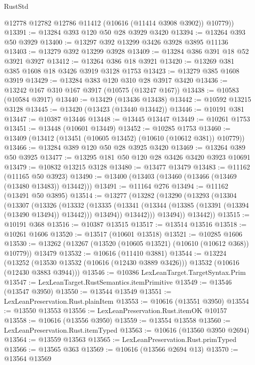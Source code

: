 \begin{lexlean}{RustStd}
\begin{coremodule}
        @12778
        @12782
        @12786
        @11412
        (@10616 (@11414 @3908 @3902))
        @10779))
@13391 := @13284 @393 @120 @50 @28 @3929 @3420
@13394 := @13264 @393 @50 @3929
@13400 := @13297 @392 @13299 @3426 @3928 @3895 @11136
@13403 := @13279 @392 @13299 @3928
@13409 := @13284 @386 @391 @18 @52 @3921 @3927
@13412 := @13264 @386 @18 @3921
@13420 := @13269 @381 @385 @1608 @18 @3426 @3919 @3128 @1753
@13423 := @13279 @385 @1608 @3919
@13429 := @13284 @383 @120 @310 @28 @3917 @3420
@13436 := @13242 @167 @310 @167 @3917 (@10575 (@13247 @167))
@13438 := @10583 (@10584 @3917)
@13440 := @13429 (@13436 @13438)
@13442 := @10592 @13215 @3128
@13445 := @13420 (@13423 (@13440 @13442))
@13446 := @10191 @381
@13447 := @10387 @13446
@13448 := @13445 @13447
@13449 := @10261 @1753
@13451 := @13448 (@10601 @13449)
@13452 := @10285 @1753
@13460 := @13409 (@13412 (@13451 (@10605 @13452) (@10610 (@10612 @381)) @10779))
@13466 := @13284 @389 @120 @50 @28 @3925 @3420
@13469 := @13264 @389 @50 @3925
@13477 := @13295 @181 @50 @120 @28 @3426 @3420 @3923 @10691
@13479 := @10832 @13215 @3128
@13480 := @13477 @13479
@13483 := @11162 (@11165 @50 @3923)
@13490 := @13400 (@13403 (@13460 (@13466 (@13469 (@13480 @13483)) @13442)))
@13491 := @11164 @276
@13494 := @11162 (@13491 @50 @3895)
@13514 := @13277
    (@13282
      (@13290
        (@13293
          (@13304
            (@13307
              (@13326
                (@13332
                  (@13335
                    (@13341 (@13344 (@13385 (@13391 (@13394 (@13490 @13494)) @13442))) @13494))
                  @13442)))
            @13494))
        @13442))
@13515 := @10191 @368
@13516 := @10387 @13515
@13517 := @13514 @13516
@13518 := @10261 @1606
@13520 := @13517 (@10601 @13518)
@13521 := @10285 @1606
@13530 := @13262 (@13267 (@13520 (@10605 @13521) (@10610 (@10612 @368)) @10779)) @13479
@13532 := @10616 (@11410 @3881)
@13544 := @13224
    (@13252 (@13530 @13532 (@10616 (@12430 @3889 @3426))) @13532 (@10616 (@12430 @3883 @3944)))
@13546 := @10386 LexLeanTarget.TargetSyntax.Prim
@13547 := LexLeanTarget.RustSemantics.itemPrimitive
@13549 := @13546 (@13547 @3950)
@13550 := @13544 @13549
@13551 := LexLeanPreservation.Rust.plainItem
@13553 := @10616 (@13551 @3950)
@13554 := @13550 @13553
@13556 := LexLeanPreservation.Rust.itemOK @10157
@13558 := @10616 (@13556 @3950)
@13559 := @13554 @13558
@13560 := LexLeanPreservation.Rust.itemTyped
@13563 := @10616 (@13560 @3950 @2694)
@13564 := @13559 @13563
@13565 := LexLeanPreservation.Rust.primTyped
@13566 := @13565 @363
@13569 := @10616 (@13566 @2694 @13)
@13570 := @13564 @13569

\end{coremodule}
\end{lexlean}
